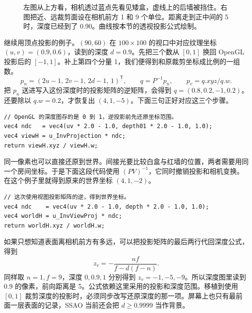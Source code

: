 \begin{figure}[H]\centering

\caption{左图从上方看，相机透过蓝点先看见矮盒，虚线上的后墙被挡住。右图把近、远裁剪面设在相机前方 1 和 9 个单位。距离走到正中间的 5 时，深度已经到了 0.90。曲线按本节的透视投影公式绘制。}
\end{figure}

继续用顶点投影的例子。$(90,60)$ 在 $100\times100$ 的视口中对应纹理坐标 $(u,v)=(0.9,0.6)$，读到的深度 $d=0.9$。先把三个数从 $[0,1]$ 换回 OpenGL 投影后的 $[-1,1]$。补上第四个分量 1，我们便得到和原裁剪坐标成比例的一组数。
\[
 p_n=(2u-1,\,2v-1,\,2d-1,\,1)^{\mathsf T},\qquad
 q=P^{-1}p_n,\qquad p_v=q.xyz/q.w.
\]
把 $p_n$ 送进写入这份深度时的投影矩阵的逆矩阵，会得到 $q=(0.8,0.2,-1,0.2)$。还要除以 $q.w=0.2$，才恢复出 $(4,1,-5)$。下面三句正好对应这三个步骤。
\begin{lstlisting}
// OpenGL 的深度图存的是 0 到 1，逆投影前先还原坐标范围。
vec4 ndc   = vec4(uv * 2.0 - 1.0, depth01 * 2.0 - 1.0, 1.0);
vec4 viewH = u_InvProjection * ndc;
return viewH.xyz / viewH.w;
\end{lstlisting}

同一像素也可以直接还原到世界。间接光要比较白盒与红墙的位置，两者需要用同一个房间坐标。于是下面这段代码使用 $(PV)^{-1}$，它同时撤销投影和相机变换。在这个例子里就得到原来的世界坐标 $(4,1,-2)$。
\begin{lstlisting}
// 这次使用视图投影矩阵的逆，得到世界坐标。
vec4 ndc    = vec4(uv * 2.0 - 1.0, depth * 2.0 - 1.0, 1.0);
vec4 worldH = u_InvViewProj * ndc;
return worldH.xyz / worldH.w;
\end{lstlisting}

如果只想知道表面离相机前方有多远，可以把投影矩阵的最后两行代回深度公式，得到
\[
 z_v=-\frac{nf}{f-d(f-n)} .
\]
同样取 $n=1,f=9$，深度 $0,0.9,1$ 分别得到 $z_v=-1,-5,-9$。所以深度图里读到 $0.9$ 的像素，前向距离是 5。公式依赖这里采用的投影和深度范围。移植到使用 $[0,1]$ 裁剪深度的投影时，必须同步改写还原深度的那一项。屏幕上也只有最前面一层表面的记录，SSAO 当前还会把 $d\ge0.9999$ 当作背景。

\newpage
